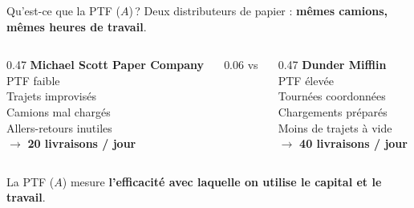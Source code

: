 \documentclass[aspectratio=169]{beamer}
\begin{document}
\begin{frame}[t]{Qu'est-ce que la PTF ($A$)\,?}\examtag
   \small
   Deux distributeurs de papier : \textbf{mêmes camions, mêmes heures de travail}.
   \vspace{0.25cm}
   \begin{columns}[T]
      \begin{column}{0.47\textwidth}
         \centering
         \textcolor{HECgray}{\textbf{Michael Scott Paper Company}}\\[5pt]
         \textcolor{HECgray}{PTF faible}\\[6pt]
         \footnotesize
         Trajets improvisés\\
         Camions mal chargés\\
         Allers-retours inutiles\\[6pt]
         $\to$ \textbf{20 livraisons / jour}
      \end{column}
      \begin{column}{0.06\textwidth}
         \centering
         \vspace{0.8cm}
         {\Large\textcolor{HECgray}{vs}}
      \end{column}
      \begin{column}{0.47\textwidth}
         \centering
         \textcolor{HECgreen}{\textbf{Dunder Mifflin}}\\[5pt]
         \textcolor{HECgreen}{PTF élevée}\\[6pt]
         \footnotesize
         Tournées coordonnées\\
         Chargements préparés\\
         Moins de trajets à vide\\[6pt]
         $\to$ \textbf{40 livraisons / jour}
      \end{column}
   \end{columns}
   \vspace{0.2cm}
   \vspace{0.15cm}
   \begin{keyinsight}
      La PTF ($A$) mesure \textbf{l'efficacité avec laquelle on utilise le capital et le travail}.
   \end{keyinsight}
\end{frame}
\end{document}
